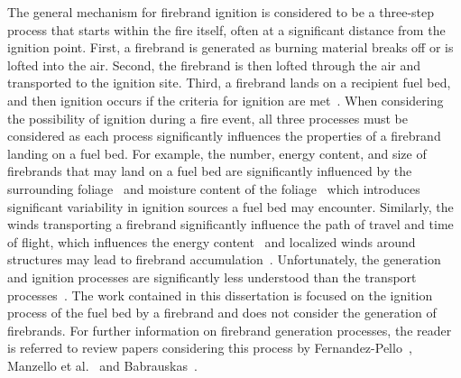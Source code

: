     The general mechanism for firebrand ignition is considered to be a three-step process that starts within the fire itself, often at a significant distance from the ignition point. First, a firebrand is generated as burning material breaks off or is lofted into the air. Second, the firebrand is then lofted through the air and transported to the ignition site. Third, a firebrand lands on a recipient fuel bed, and then ignition occurs if the criteria for ignition are met~\cite{Babrauskas2003}. When considering the possibility of ignition during a fire event, all three processes must be considered as each process significantly influences the properties of a firebrand landing on a fuel bed. For example, the number, energy content, and size of firebrands that may land on a fuel bed are significantly influenced by the surrounding foliage~\cite{Hudson2020EffectsScale} and moisture content of the foliage~\cite{Adusumilli2021FirebrandShrub} which introduces significant variability in ignition sources a fuel bed may encounter. Similarly, the winds transporting a firebrand significantly influence the path of travel and time of flight, which influences the energy content~\cite{Sardoy2007, MatvienkoOVA2016} and localized winds around structures may lead to firebrand accumulation~\cite{Suzuki2020a, Suzuki2017a, Suzuki2015}. Unfortunately, the generation and ignition processes are significantly less understood than the transport processes~\cite{Manzello2020}. The work contained in this dissertation is focused on the ignition process of the fuel bed by a firebrand and does not consider the generation of firebrands. For further information on firebrand generation processes, the reader is referred to review papers considering this process by Fernandez-Pello~\cite{Fernandez-Pello2017}, Manzello et al.~\cite{Manzello2020} and Babrauskas~\cite{Babrauskas2003}.
    
